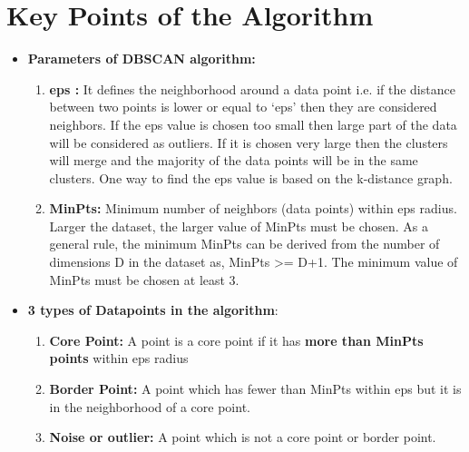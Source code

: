 \documentclass[a4paper, 11pt]{article}
\begin{document}
\section{Key Points of the Algorithm}
\begin{itemize}
    \item \textbf{Parameters of DBSCAN algorithm:}
      \begin{enumerate}
       \item \textbf{eps :} It defines the neighborhood around a data point i.e. if the distance between two points is lower or equal to ‘eps’ then they are considered neighbors. If the eps value is chosen too small then large part of the data will be considered as outliers. If it is chosen very large then the clusters will merge and the majority of the data points will be in the same clusters. One way to find the eps value is based on the k-distance graph.
       \item \textbf{MinPts: } Minimum number of neighbors (data points) within eps radius. Larger the dataset, the larger value of MinPts must be chosen. As a general rule, the minimum MinPts can be derived from the number of dimensions D in the dataset as, MinPts >= D+1. The minimum value of MinPts must be chosen at least 3.
      \end{enumerate}

    \item \textbf{3 types of Datapoints in the algorithm}:
    \begin{enumerate}
        \item \textbf{Core Point:} A point is a core point if it has \textbf{more than MinPts points} within eps radius 
        \item \textbf{Border Point:} A point which has fewer than MinPts within eps but it is in the neighborhood of a core point. 
        \item \textbf{Noise or outlier:} A point which is not a core point or border point.


\end{enumerate}
\end{itemize}
\end{document}
